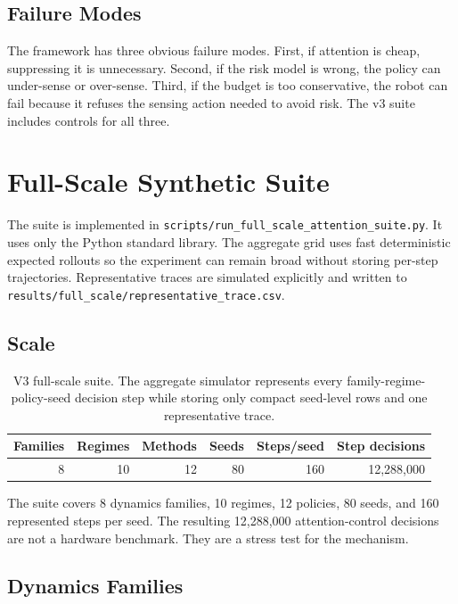 \documentclass{article}
\begin{document}
\subsection{Failure Modes}

The framework has three obvious failure modes.
First, if attention is cheap, suppressing it is unnecessary.
Second, if the risk model is wrong, the policy can under-sense or over-sense.
Third, if the budget is too conservative, the robot can fail because it refuses
the sensing action needed to avoid risk. The v3 suite includes controls for all
three.

\section{Full-Scale Synthetic Suite}

The suite is implemented in
\texttt{scripts/run\_full\_scale\_attention\_suite.py}. It uses only the Python
standard library. The aggregate grid uses fast deterministic expected rollouts
so the experiment can remain broad without storing per-step trajectories.
Representative traces are simulated explicitly and written to
\texttt{results/full\_scale/representative\_trace.csv}.

\subsection{Scale}

\begin{table}[t]
\centering
\small
\caption{V3 full-scale suite. The aggregate simulator represents every
family-regime-policy-seed decision step while storing only compact seed-level
rows and one representative trace.}
\label{tab:scale}
\begin{tabular}{rrrrrr}
\toprule
Families & Regimes & Methods & Seeds & Steps/seed & Step decisions \\
\midrule
8 & 10 & 12 & 80 & 160 & 12,288,000 \\
\bottomrule
\end{tabular}
\end{table}

The suite covers 8 dynamics families, 10 regimes, 12 policies, 80 seeds, and
160 represented steps per seed. The resulting 12,288,000 attention-control
decisions are not a hardware benchmark. They are a stress test for the
mechanism.

\subsection{Dynamics Families}
\end{document}
